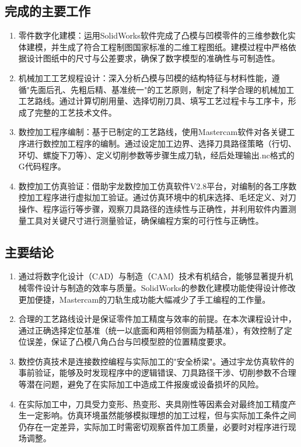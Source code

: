 \documentclass{xautCADreport}
\begin{document}
\subsection{完成的主要工作}

\begin{enumerate}
  \item 零件数字化建模：运用SolidWorks软件完成了凸模与凹模零件的三维参数化实体建模，并生成了符合工程制图国家标准的二维工程图纸。建模过程中严格依据设计图纸中的尺寸与公差要求，确保了数字模型的准确性与可制造性。
  \item 机械加工工艺规程设计：深入分析凸模与凹模的结构特征与材料性能，遵循"先面后孔、先粗后精、基准统一"的工艺原则，制定了科学合理的机械加工工艺路线。通过计算切削用量、选择切削刀具、填写工艺过程卡与工序卡，形成了完整的工艺技术文件。
  \item 数控加工程序编制：基于已制定的工艺路线，使用Mastercam软件对各关键工序进行数控加工程序的编制。通过设定加工边界、选择刀具路径策略（行切、环切、螺旋下刀等）、定义切削参数等步骤生成刀轨，经后处理输出.nc格式的G代码程序。
  \item 数控加工仿真验证：借助宇龙数控加工仿真软件V2.8平台，对编制的各工序数控加工程序进行虚拟加工验证。通过仿真环境中的机床选择、毛坯定义、对刀操作、程序运行等步骤，观察刀具路径的连续性与正确性，并利用软件内置测量工具对关键尺寸进行测量验证，确保编程方案的可行性与正确性。
\end{enumerate}

\subsection{主要结论}

\begin{enumerate}
  \item 通过将数字化设计（CAD）与制造（CAM）技术有机结合，能够显著提升机械零件设计与制造的效率与质量。SolidWorks的参数化建模功能使得设计修改更加便捷，Mastercam的刀轨生成功能大幅减少了手工编程的工作量。
  \item 合理的工艺路线设计是保证零件加工精度与效率的前提。在本次课程设计中，通过正确选择定位基准（统一以底面和两相邻侧面为精基准），有效控制了定位误差，保证了凸模八角凸台与凹模型腔的位置精度要求。
  \item 数控仿真技术是连接数控编程与实际加工的"安全桥梁"。通过宇龙仿真软件的事前验证，能够及时发现程序中的逻辑错误、刀具路径干涉、切削参数不合理等潜在问题，避免了在实际加工中造成工件报废或设备损坏的风险。
  \item 在实际加工中，刀具受力变形、热变形、夹具刚性等因素会对最终加工精度产生一定影响。仿真环境虽然能够模拟理想的加工过程，但与实际加工条件之间仍存在一定差异，实际加工时需密切观察首件加工质量，必要时对程序进行现场调整。
\end{enumerate}
\end{document}
